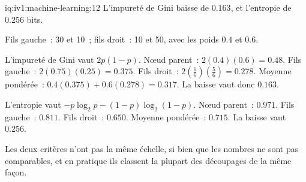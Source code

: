 \begin{solution}{iq:iv1:machine-learning:12}
L'impureté de Gini baisse de $0.163$, et l'entropie de $0.256$ bits.

Fils gauche~: 30 et 10~; fils droit~: 10 et 50, avec les poids $0.4$ et $0.6$.

L'impureté de Gini vaut $2p(1 - p)$. Nœud parent~: $2(0.4)(0.6) = 0.48$. Fils gauche~: $2(0.75)(0.25) = 0.375$. Fils droit~: $2(\frac16)(\frac56) = 0.278$. Moyenne pondérée~: $0.4(0.375) + 0.6(0.278) = 0.317$. La baisse vaut donc $0.163$.

L'entropie vaut $-p\log_2 p - (1 - p)\log_2(1 - p)$. Nœud parent~: $0.971$. Fils gauche~: $0.811$. Fils droit~: $0.650$. Moyenne pondérée~: $0.715$. La baisse vaut $0.256$.

Les deux critères n'ont pas la même échelle, si bien que les nombres ne sont pas comparables, et en pratique ils classent la plupart des découpages de la même façon.



\end{solution}

